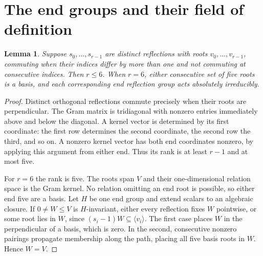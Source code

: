 \documentclass[11pt,a4paper]{article}
\newtheorem{lemma}[theorem]{Lemma}
\newcommand{\gen}[1]{\langle#1\rangle}
\begin{document}
\section{The end groups and their field of definition}
\begin{lemma}\label{path}
Suppose $s_0,\ldots,s_{r-1}$ are distinct reflections with roots
$v_0,\ldots,v_{r-1}$, commuting when their indices differ by more
than one and not commuting at consecutive indices. Then $r\le6$.
When $r=6$, either consecutive set of five roots is a basis, and
each corresponding end reflection group acts absolutely irreducibly.
\end{lemma}
\begin{proof}
Distinct orthogonal reflections commute precisely when their roots
are perpendicular. The Gram matrix is tridiagonal with nonzero
entries immediately above and below the diagonal. A kernel vector
is determined by its first coordinate: the first row determines the
second coordinate, the second row the third, and so on. A nonzero
kernel vector has both end coordinates nonzero, by applying this
argument from either end. Thus its rank is at least $r-1$ and at
most five.

For $r=6$ the rank is five. The roots span $V$ and their
one-dimensional relation space is the Gram kernel. No relation
omitting an end root is possible, so either end five are a basis.
Let $H$ be one end group and extend scalars to an algebraic closure.
If $0\ne W\le V$ is $H$-invariant, either every reflection fixes
$W$ pointwise, or some root lies in $W$, since
$(s_i-1)W\subseteq\gen{v_i}$. The first case places $W$ in the
perpendicular of a basis, which is zero. In the second, consecutive
nonzero pairings propagate membership along the path, placing all
five basis roots in $W$. Hence $W=V$.
\end{proof}
\end{document}
